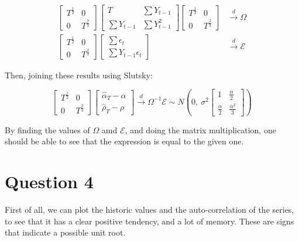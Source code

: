 \documentclass[12pt]{article}
\begin{document}
\begin{align*}
    \begin{bmatrix}
        T^\frac{1}{2} & 0 \\ 0 & T^\frac{2}{3}
    \end{bmatrix}\begin{bmatrix}
        T & \sum Y_{t-1}\\ \sum Y_{t-1} & \sum Y^2_{t-1}
    \end{bmatrix}\begin{bmatrix}
        T^\frac{1}{2} & 0 \\ 0 & T^\frac{2}{3}
    \end{bmatrix} &\xrightarrow{d} \Omega\\
    \begin{bmatrix}
        T^\frac{1}{2} & 0 \\ 0 & T^\frac{2}{3}
    \end{bmatrix}\begin{bmatrix}
        \sum \epsilon_t \\ \sum Y_{t-1}\epsilon_t
    \end{bmatrix} &\xrightarrow{d} \mathcal{E}
\end{align*}

Then, joining these results using Slutsky:

$$
\begin{bmatrix}
    T^\frac{1}{2} & 0 \\ 0 & T^\frac{2}{3}
\end{bmatrix} \begin{bmatrix}
    \hat{\alpha}_T - \alpha\\ \hat{\rho}_T - \rho
\end{bmatrix} \xrightarrow{d} \Omega^{-1}\mathcal{E} \sim N\left(0,~ \sigma^2 \begin{bmatrix}
    1 & \frac{\alpha}{2} \\ \frac{\alpha}{2} & \frac{\alpha^2}{3}
\end{bmatrix}\right)
$$

By finding the values of $\Omega$ amd $\mathcal{E}$, and doing the matrix multiplication, one should be able to see that the expression is equal to the given one.



\section*{Question 4}

First of all, we can plot the historic values and the auto-correlation of the series, to see that it has a clear positive tendency, and a lot of memory. These are signs that indicate a possible unit root.
\end{document}
